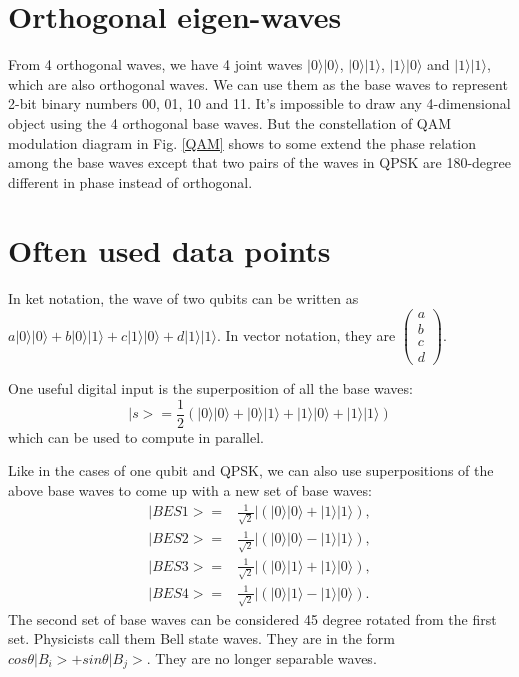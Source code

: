 \documentclass{book}
\newcommand\keta[2][]{#1\lvert {#2} #1\rangle}
\begin{document}
\section{Orthogonal eigen-waves}
From 4 orthogonal waves, we have 4 joint waves $\keta{0}\keta{0}$, $\keta{0}\keta{1}$, $\keta{1}\keta{0}$ and $\keta{1}\keta{1}$, which are also orthogonal waves. We can use them as the base waves to represent 2-bit binary numbers 00, 01, 10 and 11. It's impossible to draw any 4-dimensional object using the 4 orthogonal base waves. But the constellation of QAM modulation diagram in Fig. \ref{QAM} shows to some extend the phase relation among the base waves except that two pairs of the waves in QPSK are 180-degree different in phase instead of orthogonal.

\section{Often used data points}
In ket notation, the wave of two qubits can be written as
$a\keta{0}\keta{0} + b \keta{0}\keta{1} + c \keta{1}\keta{0} + d \keta{1}\keta{1}$.
In vector notation, they are
$
\begin{pmatrix}
    a \\
    b \\
    c \\
    d
\end{pmatrix}$.

One useful digital input is the superposition of all the base waves:
\begin{equation}
    |s> = \frac 1 2 (\keta{0}\keta{0}+\keta{0}\keta{1}+\keta{1}\keta{0}+\keta{1}\keta{1})
\end{equation}
which can be used to compute in parallel.

Like in the cases of one qubit and QPSK, we can also use superpositions of the above base waves to come up with a new set of base waves:
\begin{equation}
\begin{array}{rl}
    |BES1> =& \frac 1 {\sqrt 2}| (\keta{0}\keta{0}+\keta{1}\keta{1}),\\
    |BES2> =& \frac 1 {\sqrt 2}| (\keta{0}\keta{0}-\keta{1}\keta{1}),\\
    |BES3> =& \frac 1 {\sqrt 2}| (\keta{0}\keta{1}+\keta{1}\keta{0}),\\
    |BES4> =& \frac 1 {\sqrt 2}| (\keta{0}\keta{1}-\keta{1}\keta{0}).
\end{array}
\end{equation}
The second set of base waves can be considered 45 degree rotated from the first set. Physicists call them Bell state waves. They are in the form $cos\theta |B_i> + sin\theta |B_j>$. They are no longer separable waves.
\end{document}
